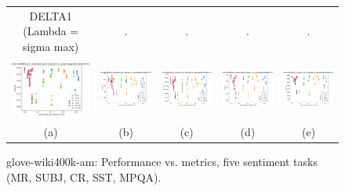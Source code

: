 \begin{figure}
\begin{tabular}{@{\hskip -0.0in}c@{\hskip -0.0in}c@{\hskip -0.0in}c@{\hskip -0.0in}c@{\hskip -0.0in}c@{\hskip -0.0in}}
		DELTA1 (Lambda = sigma max) & . & . & . & .\\
		\includegraphics[width=.2\linewidth]{figures/glove-wiki400k-am_sentiment_mr_test-acc_vs_gram-large-dim-delta1-6-trans_linx.pdf} &
		\includegraphics[width=.2\linewidth]{figures/glove-wiki400k-am_sentiment_subj_test-acc_vs_gram-large-dim-delta1-6-trans_linx.pdf} &
		\includegraphics[width=.2\linewidth]{figures/glove-wiki400k-am_sentiment_cr_test-acc_vs_gram-large-dim-delta1-6-trans_linx.pdf} &
		\includegraphics[width=.2\linewidth]{figures/glove-wiki400k-am_sentiment_sst_test-acc_vs_gram-large-dim-delta1-6-trans_linx.pdf} &
		\includegraphics[width=.2\linewidth]{figures/glove-wiki400k-am_sentiment_mpqa_test-acc_vs_gram-large-dim-delta1-6-trans_linx.pdf} \\	
		\;\;\;\;\;(a) & \;\;\;\;\;\;(b) & \;\;\;\;\;\;(c) & \;\;\;\;\;\;(d) & \;\;\;\;\;\;(e)
	\end{tabular}
	\caption{glove-wiki400k-am: Performance vs. metrics, five sentiment tasks (MR, SUBJ, CR, SST, MPQA).
	}
	\label{fig:glove_wiki400k_am_sent_comparison_results}
\end{figure}

